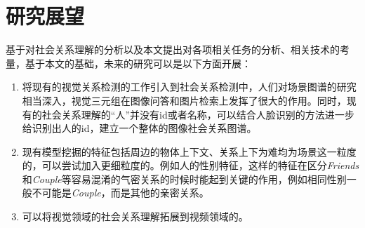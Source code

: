 \section{研究展望}

基于对社会关系理解的分析以及本文提出对各项相关任务的分析、相关技术的考量，基于本文的基础，未来的研究可以是以下方面开展：
\begin{enumerate}
    \item 将现有的视觉关系检测的工作引入到社会关系检测中，人们对场景图谱的研究相当深入，视觉三元组在图像问答和图片检索上发挥了很大的作用。同时，现有的社会关系理解的``人''并没有id或者名称，可以结合人脸识别的方法进一步给识别出人的id，建立一个整体的图像社会关系图谱。
    \item 现有模型挖掘的特征包括周边的物体上下文、关系上下为难均为场景这一粒度的，可以尝试加入更细粒度的。例如人的性别特征，这样的特征在区分{\it Friends}和{\it Couple}等容易混淆的气密关系的时候时能起到关键的作用，例如相同性别一般不可能是{\it Couple}，而是其他的亲密关系。
    \item 可以将视觉领域的社会关系理解拓展到视频领域的。
\end{enumerate}

